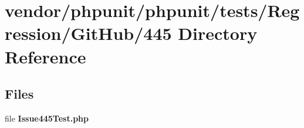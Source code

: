 \section{vendor/phpunit/phpunit/tests/\+Regression/\+Git\+Hub/445 Directory Reference}
\label{dir_ba07408a7267ae4d67a2d1543b150584}
\subsection*{Files}
\begin{DoxyCompactItemize}
\item 
file {\bf Issue445\+Test.\+php}
\end{DoxyCompactItemize}
